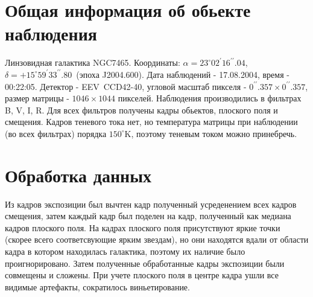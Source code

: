 \documentclass [12pt, a4paper] {article}
\theoremstyle{definition}
\begin{document}
	\section{Общая информация об обьекте наблюдения}
	Линзовидная галактика NGC7465. Координаты: $\alpha=23^{\circ} 02^{\prime} 16^{\prime \prime}.04$, $\delta = +15^{\circ}59^{\prime}33^{\prime \prime}.80$~(эпоха J2004.600). Дата наблюдений - 17.08.2004, время - 00:22:05. Детектор - EEV~CCD42-40, угловой масштаб пикселя - $0^{\prime \prime}.357\times0^{\prime \prime}.357$, размер матрицы - $1046\times1044$ пикселей. Наблюдения производились в фильтрах B, V, I, R. Для всех фильтров получены кадры обьектов, плоского поля и смещения. Кадров теневого тока нет, но температура матрицы при наблюдении (во всех фильтрах) порядка $150^\circ$K, поэтому теневым током можно принебречь.
	\section{Обработка данных}
	Из кадров экспозиции был вычтен кадр полученный усреденением всех кадров смещения, затем каждый кадр был поделен на кадр, полученный как медиана кадров плоского поля. На кадрах плоского поля присутствуют яркие точки (скорее всего соответсвующие ярким звездам), но они находятся вдали от области кадра в котором находилась галактика, поэтому их наличие было проигнорировано. Затем полученные обработанные кадры экспозиции были совмещены и сложены. 
	При учете плоского поля в центре кадра ушли все видимые артефакты, сократилось виньетирование. 
\end{document}
